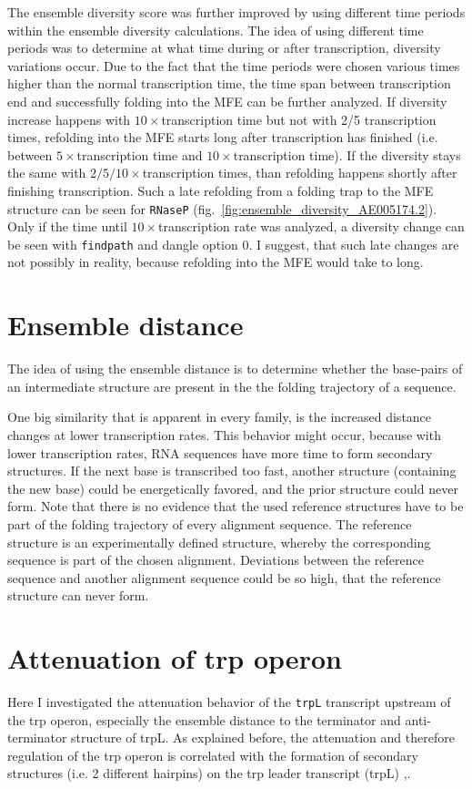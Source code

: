 \documentclass[ twoside,openright,titlepage,numbers=noenddot,headinclude,%
                footinclude=false, cleardoublepage=empty,abstractoff, %
                BCOR=5mm,paper=a4,fontsize=11pt,%
                ngerman,american,%
                ]{scrreprt}
\begin{document}
The ensemble diversity score was further improved by using different time periods within the ensemble diversity
calculations.
The idea of using different time periods was to determine at what time during or after transcription,
diversity variations occur. Due to the fact that the time periods were
chosen various times higher than the normal transcription time, the time
span between transcription end and successfully folding into the MFE can be
further analyzed.  If diversity increase happens with $10
\times$transcription time but not with 2/5 transcription times, refolding into the MFE starts long after transcription has
finished (i.e. between
$5 \times$transcription time and $10 \times$transcription time). If the
diversity stays the same with $2/5/10 \times$transcription times, than
refolding happens shortly after finishing transcription.  Such a late
refolding from a folding trap to the MFE structure can be seen for \texttt{RNaseP} (fig.~\ref{fig:ensemble_diversity_AE005174.2}). Only if the time until $10
\times$transcription rate was analyzed, a diversity change can be seen with
\texttt{findpath} and dangle option $0$. I suggest, that such late changes
are not possibly in reality, because refolding into the MFE would take to
long.


\section{Ensemble distance}
The idea of using the ensemble distance is to determine whether the base-pairs of an intermediate
structure are present in the the folding trajectory of a sequence.

One big similarity that is apparent in every family, is the increased
distance changes at lower transcription rates. This behavior might occur,
because with lower transcription rates, RNA sequences have more time to
form secondary structures. If the next base is transcribed too fast,
another structure (containing the new base) could be energetically favored,
and the prior structure could never form.  
Note that there is no evidence
that the used reference structures have to be part of the folding
trajectory of every alignment sequence. The reference structure is an
experimentally defined structure, whereby the corresponding sequence is
part of the chosen alignment. Deviations between the reference sequence and
another alignment sequence could be so high, that the reference structure
can never form.

\section{Attenuation of trp operon}
Here I investigated the attenuation behavior of the \texttt{trpL} transcript upstream of the trp operon, especially the ensemble distance to the terminator and anti-terminator structure of trpL.
As explained before, the attenuation and therefore regulation of the trp operon is correlated with the formation of secondary structures (i.e. 2 different hairpins) on the trp leader transcript (trpL) \cite{Yanofsky1977},\cite{Oxender1979}.
\end{document}
